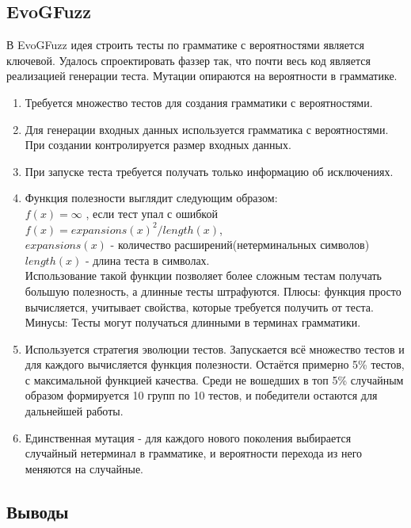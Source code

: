 \documentclass[a4paper]{article}
\begin{document}
\subsection{EvoGFuzz}
\indent

В EvoGFuzz\cite{litlink2} идея строить тесты по грамматике с вероятностями является ключевой. Удалось спроектировать фаззер так, что почти весь код является реализацией генерации теста. Мутации опираются на вероятности в грамматике. 
\begin{enumerate}
    \item Требуется множество тестов для создания грамматики с вероятностями.
    \item Для генерации входных данных используется грамматика с вероятностями. При создании контролируется размер входных данных. 
    \item При запуске теста требуется получать только информацию об исключениях.
    \item Функция полезности выглядит следующим образом:\\
    $f(x) = \infty$ , если тест упал с ошибкой\\
    $f(x) = expansions(x) ^ 2 / length(x) $,\\
    $expansions(x)$ - количество расширений(нетерминальных символов) \\
    $length(x)$ - длина теста в символах.\\
    Использование такой функции позволяет более сложным тестам получать большую полезность, а длинные тесты штрафуются. 
    Плюсы: функция просто вычисляется, учитывает свойства, которые требуется получить от теста.
    Минусы: Тесты могут получаться длинными в терминах грамматики.
    \item Используется стратегия эволюции тестов. Запускается всё множество тестов и для каждого вычисляется функция полезности. Остаётся примерно 5\% тестов, с максимальной функцией качества. Среди не вошедших в топ 5\% случайным образом формируется 10 групп по 10 тестов, и победители остаются для дальнейшей работы.
    \item Единственная мутация - для каждого нового поколения выбирается случайный нетерминал в грамматике, и вероятности перехода из него меняются на случайные.
\end{enumerate}

\subsection{Выводы}
\indent
\end{document}
